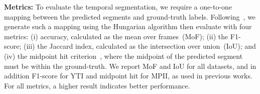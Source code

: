\documentclass[10pt,twocolumn,letterpaper]{article}
\begin{document}
\noindent\textbf{Metrics:} To evaluate the temporal segmentation, we require a one-to-one mapping between the predicted segments and ground-truth labels.  Following~\cite{ute_paper,mallow,cdfl,sct,actionset}, we generate such a mapping using the Hungarian algorithm then evaluate with four metrics: (i) accuracy, calculated as the mean over frames~(MoF); (ii) the F1-score;  (iii) the Jaccard index, calculated as the intersection over union~(IoU); and (iv) the midpoint hit criterion~\cite{rohrbach2012database}, where the midpoint of the predicted segment must be within the ground-truth. We report MoF and IoU for all datasets, and in addition F1-score for YTI and midpoint hit for MPII, as used in previous works. For all metrics, a higher result indicates better performance.



\begin{table}[t!]
\centering
{}
\end{table}
\end{document}
